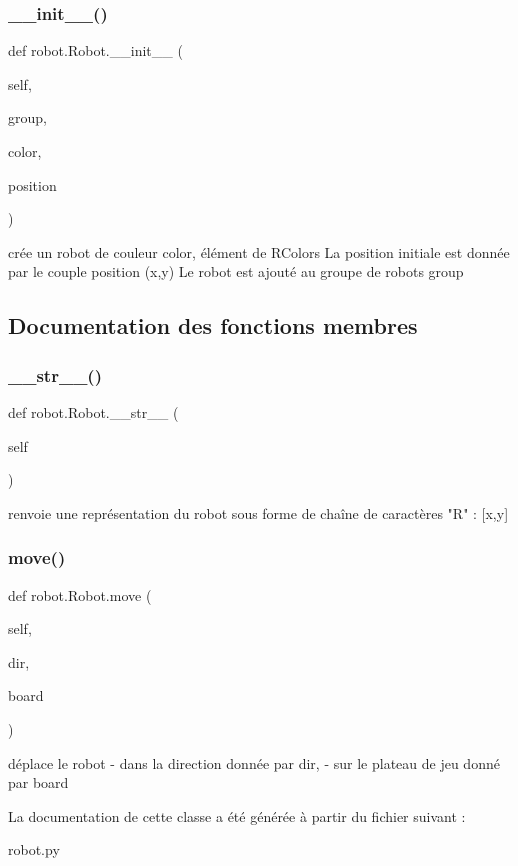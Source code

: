 \subsubsection{\texorpdfstring{\+\_\+\+\_\+init\+\_\+\+\_\+()}{\_\_init\_\_()}}
{\footnotesize\ttfamily def robot.\+Robot.\+\_\+\+\_\+init\+\_\+\+\_\+ (\begin{DoxyParamCaption}\item[{}]{self,  }\item[{}]{group,  }\item[{}]{color,  }\item[{}]{position }\end{DoxyParamCaption})}

\begin{DoxyVerb}crée un robot de couleur color, élément de RColors
La position initiale est donnée par le couple position (x,y)
Le robot est ajouté au groupe de robots group
\end{DoxyVerb}
 

\subsection{Documentation des fonctions membres}
\mbox{\label{classrobot_1_1Robot_a10d00e1924a0fce095fe0bdf888f1415}} 
\subsubsection{\texorpdfstring{\+\_\+\+\_\+str\+\_\+\+\_\+()}{\_\_str\_\_()}}
{\footnotesize\ttfamily def robot.\+Robot.\+\_\+\+\_\+str\+\_\+\+\_\+ (\begin{DoxyParamCaption}\item[{}]{self }\end{DoxyParamCaption})}

\begin{DoxyVerb}renvoie une représentation du robot sous forme de chaîne de caractères
    "R" : [x,y]
\end{DoxyVerb}
 \mbox{\label{classrobot_1_1Robot_a0227c4a66b9a23adb02a9ddf441be825}} 
\subsubsection{\texorpdfstring{move()}{move()}}
{\footnotesize\ttfamily def robot.\+Robot.\+move (\begin{DoxyParamCaption}\item[{}]{self,  }\item[{}]{dir,  }\item[{}]{board }\end{DoxyParamCaption})}

\begin{DoxyVerb}déplace le robot 
- dans la direction donnée par dir, 
- sur le plateau de jeu donné par board
\end{DoxyVerb}
 

La documentation de cette classe a été générée à partir du fichier suivant \+:\begin{DoxyCompactItemize}
\item 
robot.\+py\end{DoxyCompactItemize}
